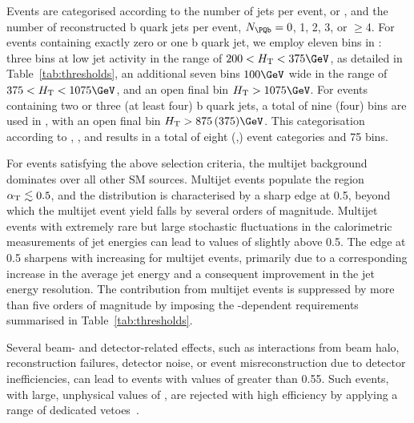 Events are categorised according to the number of jets per event,
\njetlow or \njethigh, and the number of reconstructed b quark jets
per event, $\nb = 0$, 1, 2, 3, or $\geq$4.  For events containing
exactly zero or one b quark jet, we employ eleven bins in \scalht:
three bins at low jet activity in the range of $200 < \scalht <
375\GeV$, as detailed in Table~\ref{tab:thresholds}, an additional
seven bins $100\GeV$ wide in the range of $375 < \scalht < 1075\GeV$,
and an open final bin $\scalht > 1075\GeV$.
For events containing two or three (at least four) b quark jets, a
total of nine (four) bins are used in \scalht, with an open final bin
$\scalht > 875\, (375)\GeV$.
This categorisation according to \njet, \nb, and \scalht results in a
total of eight (\njet,\nb) event categories and 75
bins.%

For events satisfying the above selection criteria, the multijet
background dominates over all other SM sources. Multijet events
populate the region $\alpha_\mathrm{T} \lesssim 0.5$, and the \alphat
distribution is characterised by a sharp edge at 0.5, beyond which the
multijet event yield falls by several orders of magnitude. Multijet
events with extremely rare but large stochastic fluctuations in the
calorimetric measurements of jet energies can lead to values of
\alphat slightly above 0.5. The edge at 0.5 sharpens with increasing
\scalht for multijet events, primarily due to a corresponding increase
in the average jet energy and a consequent improvement in the jet
energy resolution. The contribution from multijet events is suppressed
by more than five orders of magnitude by imposing the
\scalht-dependent \alphat requirements summarised in
Table~\ref{tab:thresholds}.

Several beam- and detector-related effects, such as interactions from
beam halo, reconstruction failures, detector noise, or event
misreconstruction due to detector inefficiencies, can lead to events
with values of \alphat greater than 0.55. Such events, with large,
unphysical values of \ptvecmiss, are rejected with high efficiency by
applying a range of dedicated vetoes~\cite{RA1Paper2012, cms-met}.


